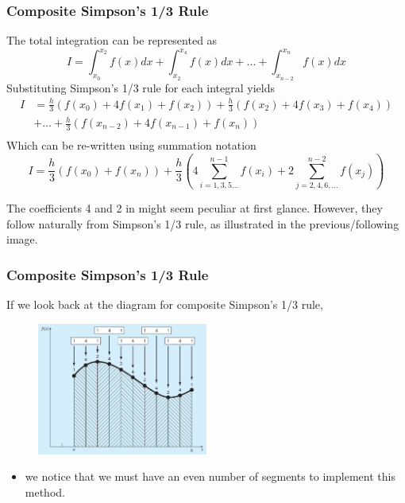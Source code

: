 \documentclass{if-beamer}
\begin{document}
\begin{frame}[t]
	\frametitle{Composite Simpson's 1/3 Rule}
	The total integration can be represented as
	$$ I = \int_{x_0}^{x_2}f(x)dx + \int_{x_2}^{x_4}f(x)dx + ... + \int_{x_{n-2}}^{x_n}f(x)dx$$
	Substituting Simpson’s 1/3 rule for each integral yields
	\begin{align*}
		I &= \frac{h}{3}(f(x_0)+4f(x_1)+f(x_2)) + \frac{h}{3}(f(x_2)+4f(x_3)+f(x_4))\\
		&+...+ \frac{h}{3}(f(x_{n-2})+4f(x_{n-1})+f(x_n))\\
	\end{align*}
	Which can be re-written using summation notation
	$$I = \frac{h}{3}(f(x_0)+f(x_n))+\frac{h}{3}\left( 4\sum_{i = 1,3,5...}^{n-1}f(x_i) + 2\sum_{j = 2,4,6,...}^{n-2} f(x_j) \right)$$
	
	The coefficients 4 and 2 in might seem peculiar at first glance. However, they follow naturally from Simpson’s 1/3 rule, as
	illustrated in the previous/following image.
\end{frame}

\begin{frame}[t]
	\frametitle{Composite Simpson's 1/3 Rule}
	If we look back at the diagram for composite Simpson's 1/3 rule, 
	\begin{figure}
		\centering
		\includegraphics[width = 0.5\textwidth]{figures/compsimp}
	\end{figure}
	\begin{itemize}
		\item we notice that we must have an even number of segments to implement this method.\\
	\end{itemize} 
\end{frame}
\end{document}
